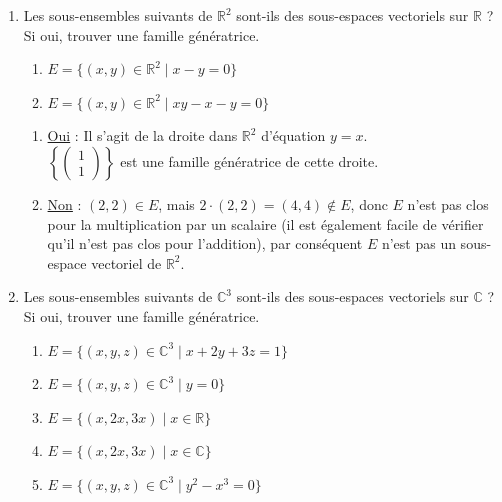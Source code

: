\documentclass[a4paper, 10pt]{report}
\begin{document}
	\begin{enumerate}[label=\arabic*.]
		\item Les sous-ensembles suivants de $\mathbb{R}^2$ sont-ils
		des sous-espaces vectoriels sur $\mathbb{R}$ ? Si oui, trouver
		une famille génératrice.
		\begin{enumerate}[label=(\alph*)]
			\item $E = \{(x, y) \in \mathbb{R}^2 \mid x - y = 0\}$
			\item $E = \{(x, y) \in \mathbb{R}^2 \mid xy - x - y = 0\}$
		\end{enumerate}
		\colorbox{solution}
		{
			\begin{minipage}{0.9\textwidth}
				\begin{enumerate}[label=(\alph*)]
					\item \underline{Oui} : Il s'agit de la droite dans
					$\mathbb{R}^2$ d'équation $y = x$.\\
					$\left\{\left(\begin{smallmatrix}
						1\\
						1
					\end{smallmatrix}\right)\right\}$
					est une famille génératrice de cette droite.
					\item \underline{Non} : $(2, 2) \in E$, mais
					$2 \cdot (2, 2) = (4, 4) \notin E$, donc $E$ n'est pas
					clos pour la multiplication par un scalaire (il est
					également facile de vérifier qu'il n'est pas clos
					pour l'addition), par conséquent $E$ n'est pas un
					sous-espace vectoriel de $\mathbb{R}^2$.
				\end{enumerate}
			\end{minipage}
		}
		\item Les sous-ensembles suivants de $\mathbb{C}^3$ sont-ils
		des sous-espaces vectoriels sur $\mathbb{C}$ ? Si oui, trouver
		une famille génératrice.
		\begin{enumerate}[label=(\alph*)]
			\item $E = \{(x, y, z) \in \mathbb{C}^3 \mid x + 2y + 3z = 1\}$
			\item $E = \{(x, y, z) \in \mathbb{C}^3 \mid y = 0\}$
			\item $E = \{(x, 2x, 3x) \mid x \in \mathbb{R}\}$
			\item $E = \{(x, 2x, 3x) \mid x \in \mathbb{C}\}$
			\item $E = \{(x, y, z) \in \mathbb{C}^3 \mid y^2 -x^3 = 0\}$
		\end{enumerate}
		\colorbox{solution}
		{
			\begin{minipage}{0.9\textwidth}

\end{minipage}}
\end{enumerate}
\end{document}
